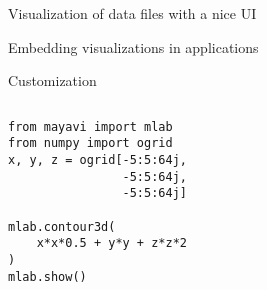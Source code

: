 \begin{frame}
    \Large
    \begin{center}
  Visualization of data files with a nice UI
    \end{center}
\end{frame}

\begin{frame}
    \Large
    \begin{center}
Embedding visualizations in applications
    \end{center}
\end{frame}

\begin{frame}
    \Large
    \begin{center}
        Customization
    \end{center}
\end{frame}

\begin{frame}
    \Huge
    \begin{center}
    \end{center}
\end{frame}


\begin{frame}
\end{frame}

\begin{frame}[fragile]
  \begin{columns}
    \hspace*{-0.45in}
      \footnotesize
\begin{lstlisting}
from mayavi import mlab
from numpy import ogrid
x, y, z = ogrid[-5:5:64j,
                -5:5:64j,
                -5:5:64j]

mlab.contour3d(
    x*x*0.5 + y*y + z*z*2
)
mlab.show()
\end{lstlisting}
    \hspace*{-0.1\linewidth}
  \end{columns}
\end{frame}

\begin{frame}[plain]
\end{frame}


